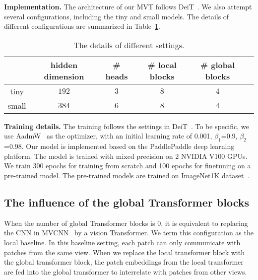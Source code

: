 \documentclass{bmvc2k}
\begin{document}
\vspace{0.1in}
\noindent \textbf{Implementation.}
The architecture of our MVT follows  DeiT~\cite{touvron2020training}. We also attempt several configurations, including the tiny and small models. The details of different configurations are summarized in Table~\ref{tab:details}.

\begin{table}[h!]
\centering
\begin{tabular}{cccccc}
\toprule
      & hidden dimension & \# heads & \# local blocks & \# global blocks &  \\ \hline
tiny  &      $192$            & $3$         &    $8$             &      $4$            &  \\ 
small &     $384$             &  $6$        &    $8$             &      $4$            &  \\  \toprule
\end{tabular}
\caption{The details of different settings.}
\label{tab:details}\vspace{-0.1in}
\end{table}


\noindent \textbf{Training details.}
The training follows the settings in DeiT~\cite{touvron2020training}. To be specific, we use AadmW~\cite{adamw} as the optimizer, with an initial learning rate of 0.001, $\beta_1$=0.9, $\beta_2$=0.98. Our model is implemented based on the PaddlePaddle deep learning platform. The model is trained with mixed precision on 2 NVIDIA V100 GPUs.  We train 300 epochs for training from scratch and 100 epochs for finetuning on a pre-trained model. The pre-trained models are trained on ImageNet1K dataset~\cite{deng2009imagenet}.

\subsection{The influence of the global Transformer blocks}
When the number of global Transformer blocks is $0$, it is equivalent to replacing the CNN in MVCNN~\cite{su2015multi} by a vision Transformer. We term this configuration as the local baseline. In this baseline setting, each patch can only communicate with patches from the same view. When we replace the local transformer block with the global transformer block, the patch embeddings from the local transformer are fed into the global transformer to interrelate with patches from other views. 
\end{document}
